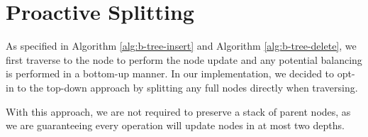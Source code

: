 \section{Proactive Splitting}

As specified in Algorithm \ref{alg:b-tree-insert} and Algorithm \ref{alg:b-tree-delete}, we first traverse to the node to perform the node update and any potential balancing is performed in a bottom-up manner. In our implementation, we decided to opt-in to the top-down approach by splitting any full nodes directly when traversing.


With this approach, we are not required to preserve a stack of parent nodes, as we are guaranteeing every operation will update nodes in at most two depths.